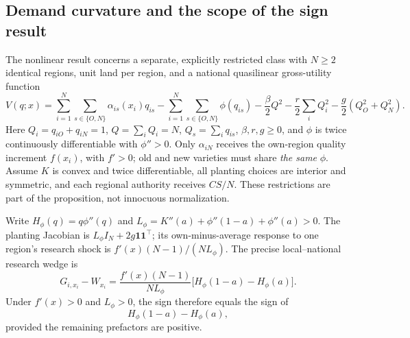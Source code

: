\documentclass[11pt,a4paper]{article}
\begin{document}
\subsection{Demand curvature and the scope of the sign result}
The nonlinear result concerns a separate, explicitly restricted class with $N\geq2$ identical regions, unit land per region, and a national quasilinear gross-utility function
\begin{equation}
V(q;x)=\sum_{i=1}^{N}\sum_{s\in\{O,N\}}\alpha_{is}(x_i)q_{is}
-\sum_{i=1}^{N}\sum_{s\in\{O,N\}}\phi(q_{is})
-\frac{\beta}{2}Q^2-\frac{r}{2}\sum_iQ_i^2
-\frac{g}{2}(Q_O^2+Q_N^2).
\label{eq:nonlinearutility}
\end{equation}
Here $Q_i=q_{iO}+q_{iN}=1$, $Q=\sum_iQ_i=N$, $Q_s=\sum_iq_{is}$, $\beta,r,g\geq0$, and $\phi$ is twice continuously differentiable with $\phi''>0$. Only $\alpha_{iN}$ receives the own-region quality increment $f(x_i)$, with $f'>0$; old and new varieties must share \emph{the same} $\phi$. Assume $K$ is convex and twice differentiable, all planting choices are interior and symmetric, and each regional authority receives $CS/N$. These restrictions are part of the proposition, not innocuous normalization.

Write $H_\phi(q)=q\phi''(q)$ and $L_\phi=K''(a)+\phi''(1-a)+\phi''(a)>0$. The planting Jacobian is $L_\phi I_N+2g\mathbf1\mathbf1^\top$; its own-minus-average response to one region's research shock is $f'(x)(N-1)/(NL_\phi)$. The precise local--national research wedge is
\begin{equation}
G_{i,x_i}-W_{x_i}
=\frac{f'(x)(N-1)}{NL_\phi}
\bigl[H_\phi(1-a)-H_\phi(a)\bigr].
\label{eq:nonlinearwedge}
\end{equation}
Under $f'(x)>0$ and $L_\phi>0$, the sign therefore equals the sign of
\begin{equation}
 H_\phi(1-a)-H_\phi(a),
 \label{eq:curvature}
\end{equation}
provided the remaining prefactors are positive.
\end{document}
